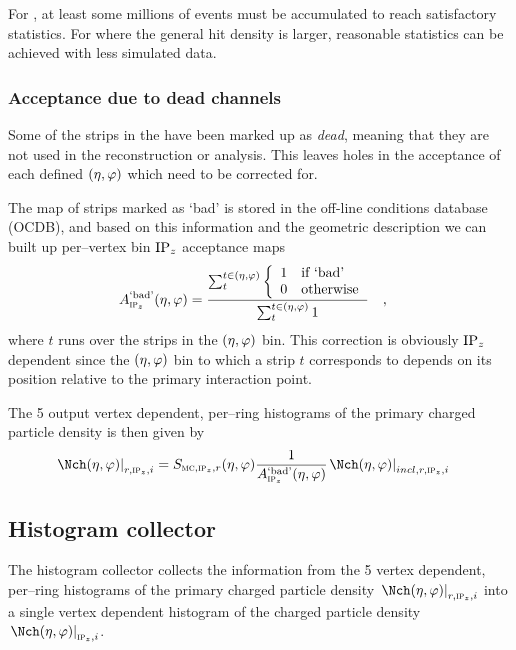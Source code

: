 \documentclass[compat,11pt]{alicenote}
\DeclareRobustCommand{\AlwaysText}[1]{\ifmmode\relax\text{#1}\else #1\fi}
\newcommand*\OCDB{\AlwaysText{OCDB}}
\newcommand*{\etaphi}{\ensuremath(\eta,\varphi)}
\newcommand*\SecMap{\ensuremath S_{\subMC,\subIPz,r}\etaphi}
\newcommand{\dndetadphi}[1][]{{\ensuremath%
    \ifx|#1|\else\left.\fi%
      \Nch\etaphi%
      \ifx|#1|\else\right|_{#1}\fi}}
\newcommand{\DeadCh}{\ensuremath A^{\text{`bad'}}_{\subIPz}\etaphi}
\begin{document}
For \ppCol{}, at least some millions of events must be accumulated to
reach satisfactory statistics.  For \PbPbCol{} where the general hit
density is larger, reasonable statistics can be achieved with less
simulated data.

\subsubsection{Acceptance due to dead channels}

Some of the strips in the \FMD{} have been marked up as \emph{dead},
meaning that they are not used in the reconstruction or analysis.
This leaves holes in the acceptance of each defined $\etaphi$ which
need to be corrected for.

The map of strips marked as `bad' is stored in the off-line conditions
database (\OCDB{}), and based on this information and the geometric
description we can built up per--vertex bin $\IPz$ acceptance maps
\begin{align}
  \label{eq:dead_channels} 
  \DeadCh{} &= 
  \frac{\sum_t^{t\in\etaphi}\left\{\begin{array}{cl}
        1 & \text{if `bad'}\\
        0 & \text{otherwise}
      \end{array}\right.}{\sum_t^{t\in\etaphi} 1}\quad,
\end{align}
where $t$ runs over the strips in the $\etaphi$ bin.  This correction
is obviously $\IPz$ dependent since the $\etaphi$ bin to which a strip $t$
corresponds to depends on its position relative to the primary
interaction point. 

The 5 output vertex dependent, per--ring histograms of the primary
charged particle density is then given by
\begin{align}
  \dndetadphi[r,\subIPz,i] &=
  \SecMap{} \frac{1}{\DeadCh{}}\dndetadphi[incl,r,\subIPz,i]
\end{align}

\subsection{Histogram collector}
\label{sec:sub:hist_collector}

The histogram collector collects the information from the 5 vertex
dependent, per--ring histograms of the primary charged particle
density $\dndetadphi[r,\subIPz,i]$ into a single vertex dependent
histogram of the charged particle density $\dndetadphi[\subIPz,i]$.
\end{document}
